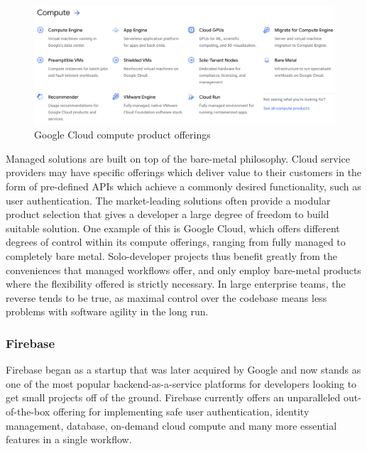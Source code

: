 \begin{figure}[h]
    \begin{center}
        \includegraphics[scale=0.4]{images/google_cloud_compute_offerings.png}
    \end{center}
    \caption{Google Cloud compute product offerings}
    \label{gcp_compute_offerings}
\end{figure}

Managed solutions are built on top of the bare-metal philosophy. Cloud service providers may have specific offerings which deliver value to their customers in the form of pre-defined APIs which achieve a commonly desired functionality, such as user authentication. The market-leading solutions often provide a modular product selection that gives a developer a large degree of freedom to build suitable solution. One example of this is Google Cloud, which offers different degrees of control within its compute offerings, ranging from fully managed to completely bare metal. Solo-developer projects thus benefit greatly from the conveniences that managed workflows offer, and only employ bare-metal products where the flexibility offered is strictly necessary. In large enterprise teams, the reverse tends to be true, as maximal control over the codebase means less problems with software agility in the long run.

\subsubsection{Firebase}
Firebase began as a startup that was later acquired by Google and now stands as one of the most popular backend-as-a-service platforms for developers looking to get small projects off of the ground. Firebase currently offers an unparalleled out-of-the-box offering for implementing safe user authentication, identity management, database, on-demand cloud compute and many more essential features in a single workflow.

